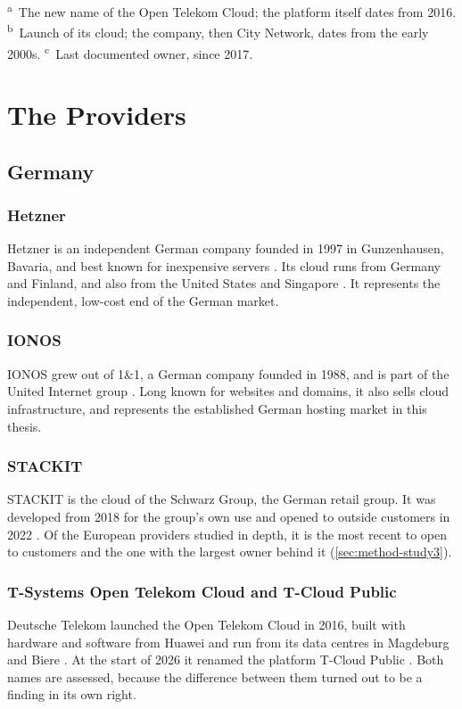 \begin{table}[htbp]
  \vspace{2pt}
  {\footnotesize\raggedright \textsuperscript{a}~The new name of the Open Telekom
  Cloud; the platform itself dates from 2016. \textsuperscript{b}~Launch of its
  cloud; the company, then City Network, dates from the early 2000s.
  \textsuperscript{c}~Last documented owner, since 2017.\par}
\end{table}

\section{The Providers}
\label{sec:provider-profiles}

\subsection{Germany}

\subsubsection*{Hetzner}
Hetzner is an independent German company founded in 1997 in Gunzenhausen,
Bavaria, and best known for inexpensive servers \cite{Hetzner_About}. Its cloud runs from Germany and Finland,
and also from the United States and Singapore \cite{Hetzner_Locations}. It
represents the independent, low-cost end of the German market.

\subsubsection*{IONOS}
IONOS grew out of 1\&1, a German company founded in 1988, and is part of the
United Internet group \cite{IONOS_About}. Long known for websites and domains, it also sells
cloud infrastructure, and represents the established German hosting market in this
thesis.

\subsubsection*{STACKIT}
STACKIT is the cloud of the Schwarz Group, the German retail group. It was
developed from 2018 for the group's own use and opened to outside customers in 2022
\cite{STACKIT_About,STACKIT_Launch_2022}.
Of the European providers studied in depth, it is the most recent to open to
customers and the one with the largest owner behind it (\cref{sec:method-study3}).

\subsubsection*{T-Systems Open Telekom Cloud and T-Cloud Public}
Deutsche Telekom launched the Open Telekom Cloud in 2016, built with hardware and
software from Huawei and run from its data centres in Magdeburg and Biere
\cite{OTC_GoesLive_2016,TCloudPublic_SecureCloud}. At the start of 2026 it
renamed the platform T-Cloud Public \cite{TCloudPublic_2026}. Both names are assessed, because
the difference between them turned out to be a finding in its own right.


